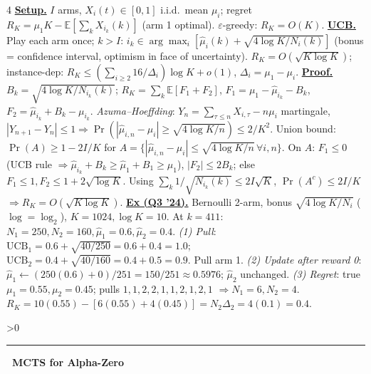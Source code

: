 \documentclass[10pt,landscape,letterpaper]{article}
\let\oldtextbf\textbf
\renewcommand{\textbf}[1]{\uline{\oldtextbf{#1}}}
\renewcommand{\section}[1]{%
  \ifnum\value{section}>0\par\vspace{1pt}\hrule\vspace{1pt}\fi
  \refstepcounter{section}\oldtextbf{\thesection\ #1}\ }
\begin{document}
\begin{multicols*}{4}
\textbf{Setup.} \(I\) arms, \(X_i(t)\in[0,1]\) i.i.d.\ mean \(\mu_i\); regret \(R_K=\mu_1 K-\mathbb E[\sum_k X_{i_k}(k)]\) (arm 1 optimal). \(\varepsilon\)-greedy: \(R_K=O(K)\).
\textbf{UCB.} Play each arm once; \(k>I\): \(i_k\in\arg\max_i[\hat\mu_i(k)+\sqrt{4\log K/N_i(k)}]\) (bonus = confidence interval, optimism in face of uncertainty).
\(R_K=O(\sqrt{K\log K})\); instance-dep: \(R_K\le(\sum_{i\ge2}16/\Delta_i)\log K+o(1)\), \(\Delta_i{=}\mu_1{-}\mu_i\).
\textbf{Proof.} \(B_k{=}\sqrt{4\log K/N_{i_k}(k)}\); \(R_K=\sum_k\mathbb E[F_1{+}F_2]\), \(F_1{=}\mu_1{-}\hat\mu_{i_k}{-}B_k\), \(F_2{=}\hat\mu_{i_k}{+}B_k{-}\mu_{i_k}\).
\emph{Azuma–Hoeffding}: \(Y_n{=}\sum_{\tau\le n}X_{i,\tau}{-}n\mu_i\) martingale, \(|Y_{n+1}{-}Y_n|\le 1\Rightarrow\Pr(|\hat\mu_{i,n}{-}\mu_i|\ge\sqrt{4\log K/n})\le 2/K^2\).
Union bound: \(\Pr(A)\ge 1{-}2I/K\) for \(A{=}\{|\hat\mu_{i,n}{-}\mu_i|\le\sqrt{4\log K/n}\,\forall i,n\}\).
On \(A\): \(F_1\le 0\) (UCB rule \(\Rightarrow\hat\mu_{i_k}{+}B_k\ge\hat\mu_1{+}B_1\ge\mu_1\)), \(|F_2|\le 2B_k\); else \(F_1\le 1,F_2\le 1{+}2\sqrt{\log K}\).
Using \(\sum_k 1/\sqrt{N_{i_k}(k)}\le 2I\sqrt K\), \(\Pr(A^c)\le 2I/K\) \(\Rightarrow R_K=O(\sqrt{K\log K})\).
\textbf{Ex (Q3 '24).} Bernoulli 2-arm, bonus \(\sqrt{4\log K/N_i}\) (\(\log{=}\log_2\)), \(K{=}1024,\log K{=}10\). At \(k{=}411\): \(N_1{=}250,N_2{=}160,\hat\mu_1{=}0.6,\hat\mu_2{=}0.4\).
\emph{(1) Pull}: \(\text{UCB}_1{=}0.6{+}\sqrt{40/250}{=}0.6{+}0.4{=}1.0\); \(\text{UCB}_2{=}0.4{+}\sqrt{40/160}{=}0.4{+}0.5{=}0.9\). Pull arm 1.
\emph{(2) Update after reward 0}: \(\hat\mu_1\leftarrow(250(0.6){+}0)/251{=}150/251{\approx}0.5976\); \(\hat\mu_2\) unchanged.
\emph{(3) Regret}: true \(\mu_1{=}0.55,\mu_2{=}0.45\); pulls \(1,1,2,2,1,1,2,1,2,1\) \(\Rightarrow N_1{=}6,N_2{=}4\). \(R_K{=}10(0.55){-}[6(0.55){+}4(0.45)]{=}N_2\Delta_2{=}4(0.1){=}\mathbf{0.4}\).

\section{MCTS for Alpha-Zero}


\end{multicols*}
\end{document}
